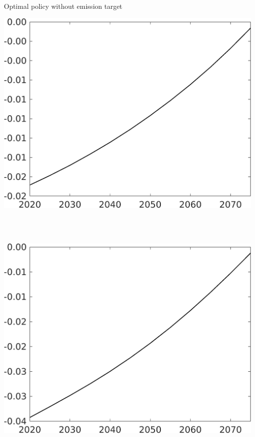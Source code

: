 \documentclass[11pt,aspectratio=169]{beamer}
\begin{document}
\begin{frame}{Optimal policy without emission target}
	\hypertarget{notopt}{}
	\centering
	\begin{minipage}[]{0.32\textwidth}
		\includegraphics[width=1\textwidth]{../codding_model/own_basedOnFried/optimalPol_elastS_DisuSci/figures/all_1705/Single_OPT_NOT_NoTaus_taul_spillover0_sep1_BN0_ineq0_red0_etaa0.79.png}
	\end{minipage}
	\begin{minipage}[]{0.05\textwidth}
		\ \ \\ 
		\ \ 
	\end{minipage}
	\begin{minipage}[]{0.32\textwidth}
		\includegraphics[width=1\textwidth]{../codding_model/own_basedOnFried/optimalPol_elastS_DisuSci/figures/all_1705/Single_OPT_NOT_NoTaus_tauf_spillover0_sep1_BN0_ineq0_red0_etaa0.79.png}
	\end{minipage}
	

\end{frame}
\end{document}
